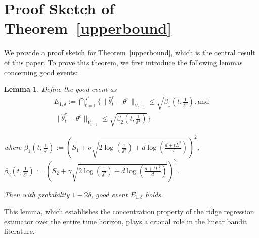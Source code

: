 \documentclass[accepted]{uai2025} %
\theoremstyle{plain}
\newtheorem{lemma}[theorem]{Lemma}
\theoremstyle{definition}
\theoremstyle{remark}
\begin{document}
\section{Proof Sketch of Theorem~\ref{upperbound}}\vspace{-.1in}
We provide a proof sketch for Theorem~\ref{upperbound}, which is the central result of this paper. To prove this theorem, we first introduce the following lemmas concerning good events:
\begin{lemma}
    \label{lem:Good_Event_1}
    Define  the good event  as
    \begin{multline*}
E_{1,\delta}:= \bigcap_{t=1}^T\bigg\{ \lVert \hat{\theta}_t^r - \theta^r  \rVert_{V_{t-1}} \le \sqrt{\beta_1\left(t, \frac{1}{\delta^2}\right)},   \text{and}\\
\lVert \hat{\theta}_t^c - \theta^c  \rVert_{V_{t-1}} \le \sqrt{\beta_2\left(t, \frac{1}{\delta^2}\right)} \bigg\}
\end{multline*}

    where $\beta_1(t,\frac{1}{\delta^2}):= (S_1 + \sigma\sqrt{2 \log(\frac{1}{\delta^2}) + d \log\left(\frac{d + t L^2}{d}\right)})^2$, $\beta_2(t,\frac{1}{\delta^2}):= (S_2 + \gamma\sqrt{2 \log(\frac{1}{\delta^2}) + d \log\left(\frac{d + t L^2}{d}\right)})^2$.
    
    Then with probability $1-2\delta$, good event $E_{1,\delta}$ holds.
\end{lemma}
This lemma, which establishes the concentration property of the ridge regression estimator over the entire time horizon, plays a crucial role in the linear bandit literature.
\end{document}
